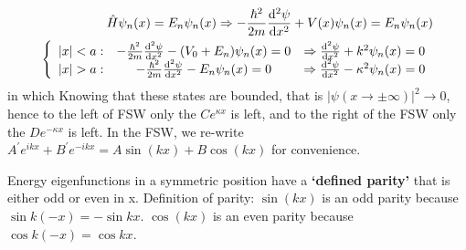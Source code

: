 \documentclass{school-22.101-notes}
\begin{document}
\begin{align}
\hat{H} \psi_n(x)  = E_n \psi_n (x)  \Rightarrow - \frac{\hbar^2}{2m }   \frac{\mathrm{d}^{2}\psi}{\mathrm{d}x^{2}} + V(x) \psi_n (x) = E_n \psi_n (x) \\
\left\{ 
\begin{array}{ccc}
|x| < a:  & - \frac{\hbar^2}{2m } \frac{\mathrm{d}^{2}\psi}{\mathrm{d}x^{2}}  -  (V_0 + E_n) \psi_n (x) = 0 & \Rightarrow \frac{\mathrm{d}^{2}\psi}{\mathrm{d}x^{2}} + k^2 \psi_n (x) = 0 \\
|x| > a:  & - \frac{\hbar^2}{2m } \frac{\mathrm{d}^{2}\psi}{\mathrm{d}x^{2}}  -  E_n \psi_n (x) = 0         & \Rightarrow \frac{\mathrm{d}^{2}\psi}{\mathrm{d}x^{2}} - \kappa^2 \psi_n (x) = 0 
\end{array}
\right.
\end{align}
in which 
Knowing that these states are bounded, that is $|\psi (x \to \pm \infty)|^2 \to 0$, hence to the left of FSW only the $C e^{\kappa x}$ is left, and to the right of the FSW only the $D e^{-\kappa x}$ is left. In the FSW, we re-write $A^{\prime} e^{ikx} + B^{\prime} e^{-ikx} = A \sin (kx) + B \cos(kx)$ for convenience. 

Energy eigenfunctions in a symmetric position have a \textbf{`defined parity'} that is either odd or even in x. Definition of parity: $\sin(kx)$ is an odd parity because $\sin k(-x) = - \sin kx$. $\cos (kx)$ is an even parity because $\cos k(-x) = \cos kx$. 
\end{document}
